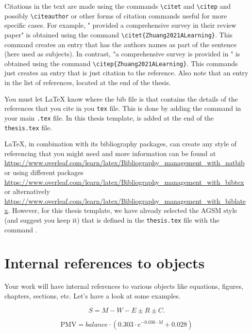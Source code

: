 \documentclass[11pt,twoside,openright]{report}
\begin{document}
Citations in the text are made using the commands \verb|\citet| and \verb|\citep| and possibly \verb|\citeauthor| or other forms of citation commands useful for more specific cases.
For example, "\citet{Zhuang2021ALearning} provided a comprehensive survey in their review paper" is obtained using the command \verb|\citet{Zhuang2021ALearning}|.
This command creates an entry that has the authors names as part of the sentence (here used as subjects). 
In contrast, "a comprehensive survey is provided in \citep{Zhuang2021ALearning}" is obtained using the command \verb|\citep{Zhuang2021ALearning}|. 
This commands just creates an entry that is just citation to the reference.
Also note that an entry in the list of references, located at the end of the thesis.

You must let \LaTeX{} know where the bib file is that contains the details of the references that you cite in you \verb|tex| file.
This is done by adding the command \verb|| in your main \verb|.tex| file.
In this thesis template, \verb|| is added at the end of the \verb|thesis.tex| file.

\LaTeX{}, in combination with its bibliography packages, can create any style of referencing that you might need and more information can be found at  \url{https://www.overleaf.com/learn/latex/Bibliography_management_with_natbib} or using different packages \url{https://www.overleaf.com/learn/latex/Bibliography_management_with_bibtex} or alternatively \url{https://www.overleaf.com/learn/latex/Bibliography_management_with_biblatex}.
However, for this thesis template, we have already selected the AGSM style (and suggest you keep it) that is defined in the \verb|thesis.tex| file with the command \verb||.


\section{Internal references to objects}
\label{ch:examples-internal_references}

Your work will have internal references to various objects like equations, figures, chapters, sections, etc. Let's have a look at some examples.

\begin{equation}\label{eq:heatbalance}
    S = M - W - E \pm R \pm C .
\end{equation}

\begin{equation}\label{eq:pmv}
    \text{PMV} = balance \cdot (0.303 \cdot e^{-0.036 \cdot M} + 0.028)
\end{equation}
\end{document}
